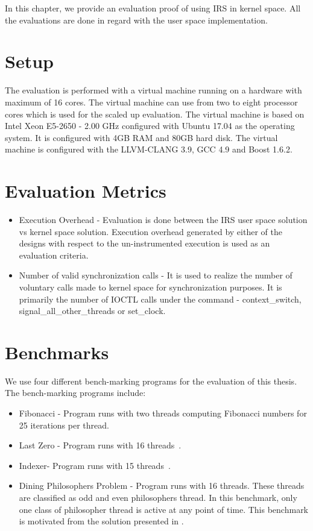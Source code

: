 In this chapter, we provide an evaluation proof of using IRS in kernel space. 
All the evaluations are done in regard with the user space implementation. 

\section{Setup}

The evaluation is performed with a virtual machine running on a hardware with maximum of 16 cores. 
The virtual machine can use from two to eight processor cores which is used for the scaled up evaluation. 
The virtual machine is based on Intel Xeon E5-2650 - 2.00 GHz configured with Ubuntu 17.04 as the operating system. 
It is configured with 4GB RAM and 80GB hard disk. 
The virtual machine is configured with the LLVM-CLANG 3.9, GCC 4.9 and Boost 1.6.2.


\section{Evaluation Metrics}

\begin{itemize}
\item{Execution Overhead} - Evaluation is done between the IRS user space solution vs kernel space solution. 
Execution overhead generated by either of the designs with respect to the un-instrumented execution is used as an evaluation criteria.
\item{Number of valid synchronization calls} - It is used to realize the number of voluntary calls made to kernel space for synchronization purposes. 
It is primarily the number of IOCTL calls under the command - context\_switch, signal\_all\_other\_threads or set\_clock.
\end{itemize}


\section{Benchmarks}

We use four different bench-marking programs for the evaluation of this thesis. 
The bench-marking programs include:
\begin{itemize}
\item{Fibonacci} - Program runs with two threads computing Fibonacci numbers for 25 iterations per thread.
\item{Last Zero} - Program runs with 16 threads~\citep{abdulla2014optimal}.
\item{Indexer}- Program runs with 15 threads~\citep{dynamic_por}.
\item{Dining Philosophers Problem} - Program runs with 16 threads. These threads are classified as odd and even philosophers thread. 
In this benchmark, only one class of philosopher thread is active at any point of time. 
This benchmark is motivated from the solution presented in \citet{silberschatz2014operating}.
\end{itemize}


